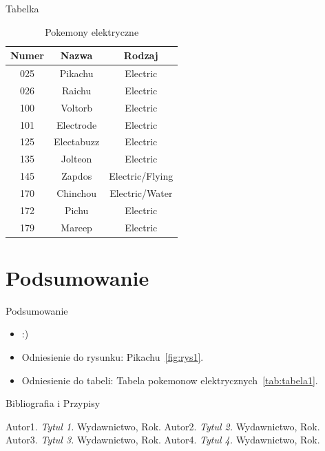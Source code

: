 \documentclass{beamer}
\begin{document}
\begin{frame}{Tabelka}
  \begin{table}
    \centering
    \begin{tabular}{|c|c|c|}
    \hline
    \textbf{Numer} & \textbf{Nazwa} & \textbf{Rodzaj} \\
    \hline
    025 & Pikachu & Electric \\
    026 & Raichu & Electric \\
    100 & Voltorb & Electric \\
    101 & Electrode & Electric \\
    125 & Electabuzz & Electric \\
    135 & Jolteon & Electric \\
    145 & Zapdos & Electric/Flying \\
    170 & Chinchou & Electric/Water \\
    172 & Pichu & Electric \\
    179 & Mareep & Electric \\
    \hline
  \end{tabular}
  \caption{Pokemony elektryczne}
    \label{tab:tabe}
  \end{table}
\end{frame}


\section{Podsumowanie}

\begin{frame}{Podsumowanie}
  \begin{itemize}
    \item :)
    \item Odniesienie do rysunku: Pikachu~\ref{fig:rys1}.
    \item Odniesienie do tabeli: Tabela pokemonow elektrycznych~\ref{tab:tabela1}.
  \end{itemize}
\end{frame}


\begin{frame}{Bibliografia i Przypisy}
  \begin{thebibliography}{99}
     Autor1. \emph{Tytul 1.} Wydawnictwo, Rok.
     Autor2. \emph{Tytul 2.} Wydawnictwo, Rok.
     Autor3. \emph{Tytul 3.} Wydawnictwo, Rok.
     Autor4. \emph{Tytul 4.} Wydawnictwo, Rok.
  \end{thebibliography}

\end{frame}
\end{document}
